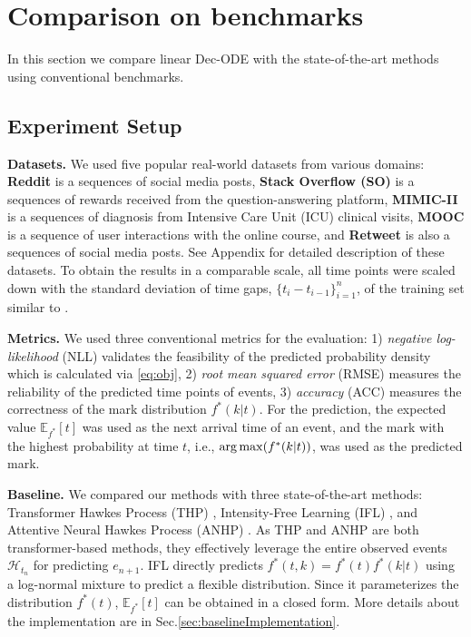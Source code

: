 
\section{Comparison on benchmarks}
In this section we compare linear Dec-ODE with the state-of-the-art methods using conventional benchmarks. 
\subsection{Experiment Setup \label{sec:experimentSetup}}
\label{sec:setup}
\textbf{Datasets.} 
We used five popular real-world datasets %
from various domains: 
{\bf Reddit} is a sequences of social media posts, 
{\bf Stack Overflow (SO)} is a sequences of rewards received from the question-answering platform, 
{\bf MIMIC-II} is a sequences of diagnosis from Intensive Care Unit (ICU) clinical visits, 
{\bf MOOC} is a sequence of user interactions with the online course,
and {\bf Retweet} is also a sequences of social media posts. See Appendix for detailed description of these datasets. 
To obtain the results in a comparable scale, all time points were scaled down with the standard deviation of time gaps, $\{t_i - t_{i-1}\}_{i=1} ^n$, of the training set similar to \cite{bib:MetaTPP}. 

\textbf{Metrics.} 
We used three conventional metrics for the evaluation: 
1) \textit{negative log-likelihood} (NLL) validates the feasibility of the predicted probability density which is calculated via \eqref{eq:obj}, 2) \textit{root mean squared error} (RMSE) measures the reliability of the predicted time points of events,  
3) \textit{accuracy} (ACC) measures the correctness of the mark distribution $f^*(k|t)$. 
For the prediction, the expected value $\mathbb{E}_{f^*} [t]$ was used as the next arrival time of an event, 
and the mark with the highest probability at time $t$, i.e., $\argmax(f^*(k|t))$, was used as the predicted mark.

\textbf{Baseline.} We compared our methods with three state-of-the-art methods: 
Transformer Hawkes Process (THP) \cite{bib:THP}, Intensity-Free Learning (IFL) \cite{bib:ifl}, and Attentive Neural Hawkes Process (ANHP) \cite{bib:ANHP}. 
As THP and ANHP are both transformer-based methods, they  
effectively leverage the entire observed events $\mathcal{H}_{t_{n}}$ for predicting $e_{n+1}$.
IFL directly predicts $f^*(t,k) = f^*(t) f^*(k|t)$ using a log-normal mixture to predict a flexible distribution. 
Since it parameterizes the distribution $f^*(t)$, $\mathbb{E}_{f^*}[t]$ can be obtained in a closed form.
More details about the implementation are in Sec.\ref{sec:baselineImplementation}.

